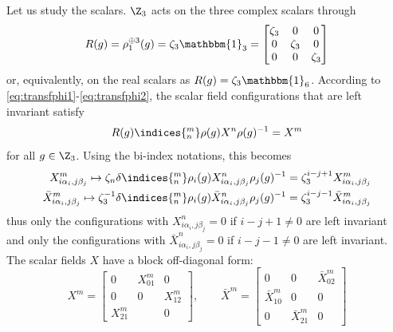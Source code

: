 \documentclass{worksheetclass}
\begin{document}
            Let us study the scalars. $\Z_3$ acts on the three complex scalars through
            \begin{equation}
                R(g)= \rho^{\oplus 3}_1(g) = \zeta_3\mathbbm{1}_3 =
                \begin{bmatrix}
                    \zeta_3 & 0 & 0 \\
                    0 & \zeta_3 & 0 \\
                    0 & 0 & \zeta_3
                \end{bmatrix}
            \end{equation}
            or, equivalently, on the real scalars as $R(g)=\zeta_3\mathbbm{1}_6$. According to \eqref{eq:transfphi1}-\eqref{eq:transfphi2}, the scalar field configurations that are left invariant satisfy
            \begin{equation}
                R(g)\indices{^m_n}\rho(g)X^n\rho(g)^{-1}=X^m
            \end{equation}
            for all $g\in\Z_3$. Using the bi-index notations, this becomes
            \begin{align}
                X^m_{i\alpha_i,j\beta_j}\mapsto  \zeta_n\delta\indices{^m_n}\rho_i(g) X^n_{i\alpha_i,j\beta_j}\rho_j(g)^{-1} = \zeta^{i-j+1}_3X^m_{i\alpha_i,j\beta_j}\\
                \bar{X}^m_{i\alpha_i,j\beta_j}\mapsto  \zeta^{-1}_3\delta\indices{^m_n}\rho_i(g) \bar{X}^n_{i\alpha_i,j\beta_j}\rho_j(g)^{-1} = \zeta^{i-j-1}_3\bar{X}^m_{i\alpha_i,j\beta_j}
            \end{align}
            thus only the configurations with $X^n_{i\alpha_i,j\beta_j}=0$ if $i-j+1\neq0$ are left invariant and only the configurations with $\bar{X}^n_{i\alpha_i,j\beta_j}=0$ if $i-j-1\neq0$ are left invariant. The scalar fields $X$ have a block off-diagonal form:
            \begin{equation}
                X^m=
                \begin{bmatrix}
                    0 & X^m_{01} & 0 \\
                    0 & 0 & X^m_{12} \\
                    X^m_{21} & & 0
                \end{bmatrix},\qquad
                \bar{X}^m=
                \begin{bmatrix}
                    0 & 0 & \bar{X}^m_{02} \\
                    \bar{X}^m_{10} & 0 & 0 \\
                    0 & \bar{X}^m_{21} & 0
                \end{bmatrix}
            \end{equation}
\end{document}

